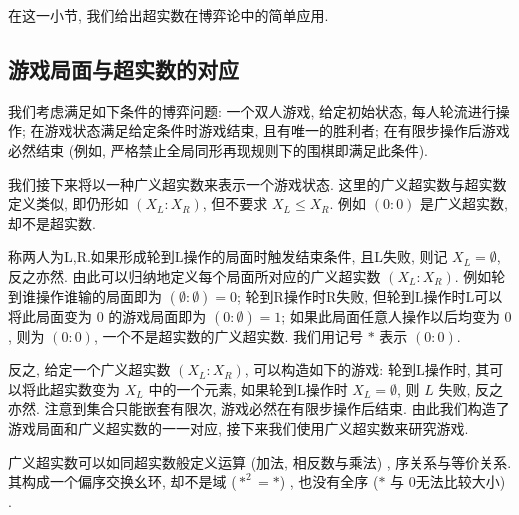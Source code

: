 在这一小节, 我们给出超实数在博弈论中的简单应用.

\subsection{游戏局面与超实数的对应}
我们考虑满足如下条件的博弈问题: 一个双人游戏, 给定初始状态, 每人轮流进行操作; 在游戏状态满足给定条件时游戏结束, 且有唯一的胜利者; 在有限步操作后游戏必然结束 (例如, 严格禁止全局同形再现规则下的围棋即满足此条件).

我们接下来将以一种广义超实数来表示一个游戏状态. 这里的广义超实数与超实数定义类似, 即仍形如 $(X_L:X_R)$, 但不要求 $X_L\leq X_R$. 例如 $(0:0)$ 是广义超实数, 却不是超实数.

称两人为L,R.如果形成轮到L操作的局面时触发结束条件, 且L失败, 则记 $X_L=\emptyset$, 反之亦然. 由此可以归纳地定义每个局面所对应的广义超实数 $(X_L:X_R)$. 例如轮到谁操作谁输的局面即为 $(\emptyset:\emptyset)=0$; 轮到R操作时R失败, 但轮到L操作时L可以将此局面变为 $0$ 的游戏局面即为 $(0:\emptyset)=1$; 如果此局面任意人操作以后均变为 $0$, 则为 $(0:0)$, 一个不是超实数的广义超实数. 我们用记号 $*$ 表示 $(0:0)$.

反之, 给定一个广义超实数 $(X_L:X_R)$, 可以构造如下的游戏: 轮到L操作时, 其可以将此超实数变为 $X_L$ 中的一个元素, 如果轮到L操作时 $X_L=\emptyset$, 则 $L$ 失败, 反之亦然. 注意到集合只能嵌套有限次, 游戏必然在有限步操作后结束. 由此我们构造了游戏局面和广义超实数的一一对应, 接下来我们使用广义超实数来研究游戏.

广义超实数可以如同超实数般定义运算 (加法, 相反数与乘法) , 序关系与等价关系. 其构成一个偏序交换幺环, 却不是域 ($*^2=*$) , 也没有全序 ($*$ 与 $0$无法比较大小) .

